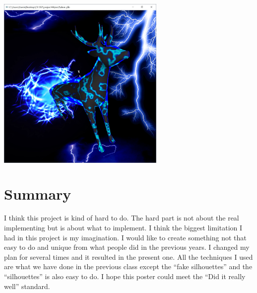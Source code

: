 \documentclass[letterpaper,14pt,titlepage,fleqn]{article}
\begin{document}
 \begin{center}
 	\includegraphics[width=3.2in]{silho.jpg}
 \end{center}
\section{Summary}
I think this project is kind of hard to do. The hard part is not about the real implementing but is about what to implement. I think the biggest limitation I had in this project is my imagination. I would like to create something not that easy to do and unique from what people did in the previous years. I changed my plan for several times and it resulted in the present one. All the techniques I used are what we have done in the previous class except the ``fake silhouettes'' and the ``silhouettes'' is also easy to do. I hope this poster could meet the ``Did it really well'' standard.
\end{document}
